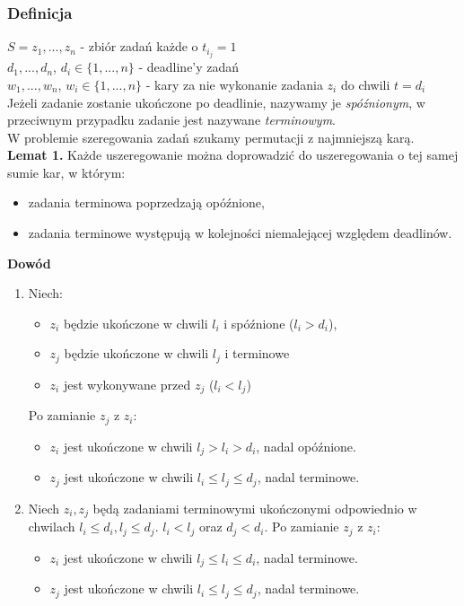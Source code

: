 \subsubsection{Definicja}
$S = {z_1, ... ,z_n}$ - zbiór zadań każde o $t_{i_j}=1$ \\
$d_1, ... , d_n$,  $d_i \in \{1,...,n\}$ - deadline'y zadań \\
$w_1, ... , w_n$, $w_i \in \{1,...,n\}$ - kary za nie wykonanie zadania $z_i$ do chwili $t=d_i$ \\
Jeżeli zadanie zostanie ukończone po deadlinie, nazywamy je \textit{spóźnionym}, w przeciwnym przypadku zadanie jest nazywane \textit{terminowym}. \\

W problemie szeregowania zadań szukamy permutacji z najmniejszą karą. \\

\textbf{Lemat 1.} 
Każde uszeregowanie można doprowadzić do uszeregowania o tej samej sumie kar, w którym:
\begin{itemize}
	\item zadania terminowa poprzedzają opóźnione,
	\item zadania terminowe występują w kolejności niemalejącej względem deadlinów.
\end{itemize}  

\textbf{Dowód}
\begin{enumerate}
	\item{Niech: 
	\begin{itemize}
		\item $z_i$ będzie ukończone w chwili $l_i$ i spóźnione ($l_i > d_i$),
		\item $z_j$ będzie ukończone w chwili $l_j$ i terminowe 
		\item $z_i$ jest wykonywane przed $z_j$ ($l_i < l_j$)
	\end{itemize}
	Po zamianie $z_j$ z $z_i$:
	\begin{itemize}
		\item $z_i$ jest ukończone w chwili $l_j > l_i > d_i$, nadal opóźnione.
		\item $z_j$ jest ukończone w chwili $l_i \leq l_j \leq d_j$, nadal terminowe.
	\end{itemize}
	}
	
	\item{Niech $z_i, z_j$ będą zadaniami terminowymi ukończonymi odpowiednio w chwilach $l_i \leq d_i , l_j \leq d_j $. $l_i < l_j$ oraz $d_j < d_i$.
	Po zamianie $z_j$ z $z_i$:
	\begin{itemize}
		\item $z_i$ jest ukończone w chwili $l_j \leq l_i \leq d_i$, nadal terminowe.
		\item $z_j$ jest ukończone w chwili $l_i \leq l_j \leq d_j$, nadal terminowe.
	\end{itemize}
	}
\end{enumerate}

